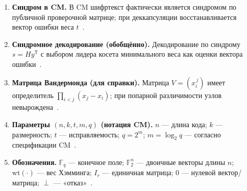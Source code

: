 \begin{enumerate}
\item \label{def:cmsyndrome}
\textbf{Синдром в CM.}
В CM шифртекст фактически является синдромом по публичной проверочной матрице; при деккапсуляции восстанавливается вектор ошибки веса \(t\)~\cite{CMspec2022}.

\item \label{def:syndec}
\textbf{Синдромное декодирование (обобщённо).}
Декодирование по синдрому \(s=Hy^{\mathsf T}\) с выбором лидера косета минимального веса как оценки вектора ошибки~\cite{HuffmanPless2003}.

\item \label{def:vander}
\textbf{Матрица Вандермонда (для справки).}
Матрица \(V=(x_i^{\,j})\) имеет определитель \(\prod_{i<j}(x_j-x_i)\); при попарной различимости узлов невырождена~\cite{HornJohnson2013}.

\item \label{def:params}
\textbf{Параметры \((n,k,t,m,q)\) (нотация CM).}
\(n\) — длина кода; \(k\) — размерность; \(t\) — исправляемость; \(q=2^m\); \(m=\log_2 q\) — согласно спецификации CM~\cite{CMspec2022}.

\item \label{def:notation}
\textbf{Обозначения.}
\(\mathbb{F}_q\) — конечное поле; \(\mathbb{F}_2^n\) — двоичные векторы длины \(n\); \(\mathrm{wt}(\cdot)\) — вес Хэмминга; \(I_r\) — единичная матрица; \(0\) — нулевой вектор/матрица; \(\perp\) — «отказ»~\cite{LidlNiederreiter1997,CMspec2022,HuffmanPless2003}.
\end{enumerate}





